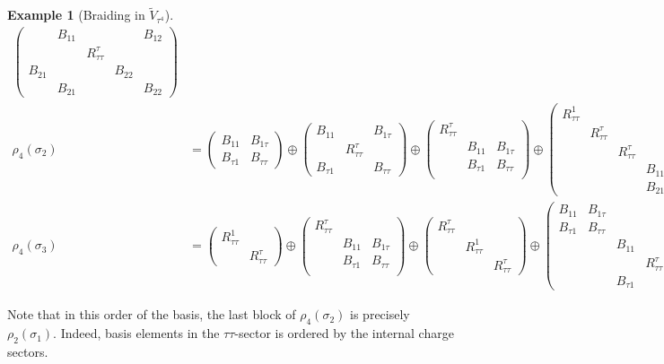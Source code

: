 \documentclass[a4paper,10pt,oneside]{book}
\theoremstyle{plain}
\theoremstyle{definition}
\newtheorem{example}{Example}[section]
\theoremstyle{remark}
\begin{document}
\begin{example}[Braiding in $\widetilde{V}_{τ^4}$]
{\begin{align*}
\begin{pmatrix}
             & B_{11} &          &        & B_{12} \\
             &        & R_{ττ}^τ \\
      B_{21} &        &          & B_{22} & \\
             & B_{21} &          &        & B_{22}
    \end{pmatrix} \\
    ρ_4(σ_2) &=
    \begin{pmatrix}
      B_{11} & B_{1τ} \\
      B_{τ1} & B_{ττ}
    \end{pmatrix}
    \oplus
    \begin{pmatrix}
      B_{11} & & B_{1τ} \\
      & R_{ττ}^τ \\
      B_{τ1} & & B_{ττ}
    \end{pmatrix}
    \oplus
    \begin{pmatrix}
      R_{ττ}^τ \\
      & B_{11} & B_{1τ} \\
      & B_{τ1} & B_{ττ} \\
    \end{pmatrix}
    \oplus
    \begin{pmatrix}
      R_{ττ}^1 \\
      & R_{ττ}^τ \\
      & & R_{ττ}^τ \\
      & & & B_{11} & B_{12} \\
      & & & B_{21} & B_{22}
    \end{pmatrix} \\
    ρ_4(σ_3) &=
    \begin{pmatrix}
      R_{ττ}^1 \\
      & R_{ττ}^τ
    \end{pmatrix}
    \oplus
    \begin{pmatrix}
      R_{ττ}^τ \\
      & B_{11} & B_{1τ} \\
      & B_{τ1} & B_{ττ} \\
    \end{pmatrix}
    \oplus
    \begin{pmatrix}
      R_{ττ}^τ \\
      & R_{ττ}^1 \\
      & & R_{ττ}^τ
    \end{pmatrix}
    \oplus
    \begin{pmatrix}
      B_{11} & B_{1τ} \\
      B_{τ1} & B_{ττ} \\
      & & B_{11} & & B_{1τ} \\
      & & & R_{ττ}^τ \\
      & & B_{τ1} & & B_{ττ}
    \end{pmatrix}
  \end{align*}}

  Note that in this order of the basis, the last block of $ρ_{4}(σ_2)$ is precisely $ρ_2(σ_1)$. Indeed, basis elements in the $ττ$-sector is ordered by the internal charge sectors.
\end{example}
\end{document}
